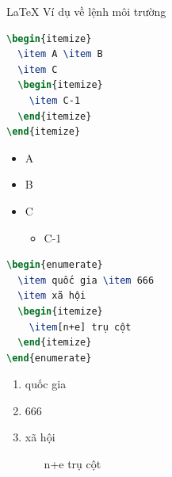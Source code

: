 \documentclass{beamer}
\begin{document}
\begin{frame}[fragile]{\LaTeX{} Ví dụ về lệnh môi trường} %
    \begin{minipage}{0.5\linewidth}
\begin{lstlisting}[language=TeX]
\begin{itemize}
  \item A \item B
  \item C
  \begin{itemize}
    \item C-1
  \end{itemize}
\end{itemize}
\end{lstlisting}
    \end{minipage}\hspace{1cm}
    \begin{minipage}{0.3\linewidth}
        \begin{itemize}
            \item A
            \item B
            \item C
            \begin{itemize}
                \item C-1
            \end{itemize}
        \end{itemize}
    \end{minipage}
    \medskip
    \pause
    \begin{minipage}{0.5\linewidth}
\begin{lstlisting}[language=TeX]
\begin{enumerate}
  \item quốc gia \item 666
  \item xã hội
  \begin{itemize}
    \item[n+e] trụ cột
  \end{itemize}
\end{enumerate}
\end{lstlisting}
    \end{minipage}\hspace{1cm}
    \begin{minipage}{0.3\linewidth}
        \begin{enumerate}
            \item quốc gia  %
            \item 666  %
            \item xã hội  %
            \begin{itemize}
                \item[n+e] trụ cột  %
            \end{itemize}
        \end{enumerate}
    \end{minipage}
\end{frame}
\end{document}
